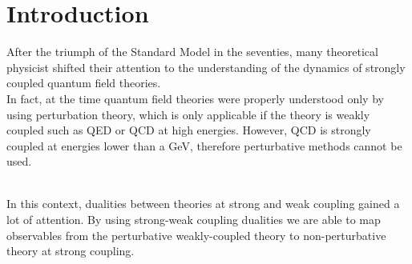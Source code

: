 
\chapter{Introduction}

After the triumph of the Standard Model in the seventies, many theoretical physicist shifted their attention to the understanding of the dynamics of strongly coupled quantum field theories. \\
In fact, at the time quantum field theories were properly understood only by using perturbation theory, which is only applicable if the theory is weakly coupled such as QED or QCD at high energies.
However, QCD is strongly coupled at energies lower than a GeV, therefore perturbative methods cannot be used.
\begin{comment}
Perturbative methods rely on the fact that the theory in question is weakly coupled, i.e. its coupling constant is much lower than one. This was not a problem for QED since its coupling constant $\alpha \sim 1/137$ is much lower than one at low energies and grows slowly while increasing the energy scale.
As a result, QED calculations have a high precision and non-perturbative methods were not needed.\\
In 1973 was discovered that quantum chromodynamics with three flavours is asymptotically free, i.e. its coupling constant becomes smaller at higher energies. 
As a result, collider physics can be understood in terms of Feynman diagrams but at low-energies the theory is strongly coupled and perturbation theory cannot be used to understand the dynamics of the theory.
Computer simulations on a lattice are the most reliable tool to investigate QCD at low-energies, but they cannot provide a complete understanding of the behavior of QCD.\\ 
\end{comment}\
\\
In this context, dualities between theories at strong and weak coupling gained a lot of attention. 
By using strong-weak coupling dualities we are able to map observables from the perturbative weakly-coupled theory to non-perturbative theory at strong coupling.
\\

